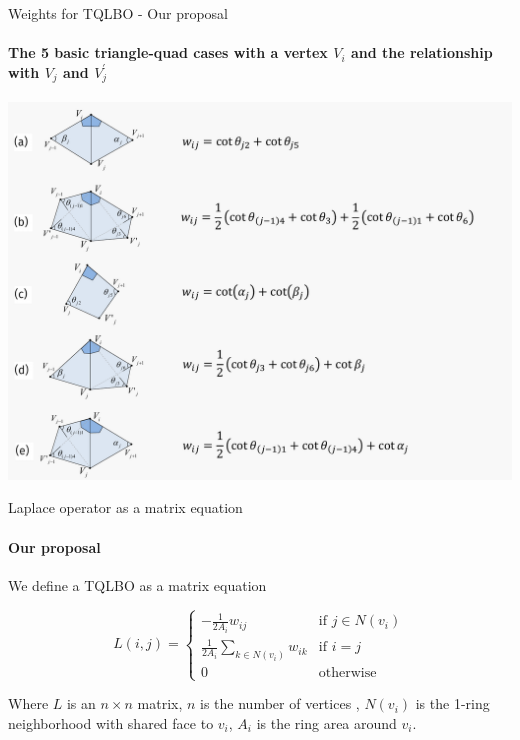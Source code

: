 \documentclass[10pt, compress, english]{beamer}
\begin{document}
\begin{frame}{Weights for TQLBO - Our proposal}


\framesubtitle{{\small{}The 5 basic triangle-quad cases with a vertex $V_{i}$
and the relationship with $V_{j}$ and $V_{j}^{\prime}$}}


\vspace{-10bp}



\hspace{10bp}\includegraphics[width=0.85\paperwidth]{img/proposal_weights}

\end{frame}

\begin{frame}{Laplace operator as a matrix equation}
\framesubtitle{Our proposal}


We define a TQLBO as a matrix equation


\begin{equation}
L\left(i,j\right)=\begin{cases}
-\frac{1}{2A_{i}}w_{ij} & \mbox{if }j\in N\left(v_{i}\right)\\
\frac{1}{2A_{i}}\underset{k\in N\left(v_{i}\right)}{\sum}w_{ik} & \mbox{if }i=j\\
0 & \mbox{otherwise}
\end{cases}\label{eq:TQLBO_Laplacian_Matrix}
\end{equation}



Where $L$ is an $n\times n$ matrix, $n$ is the number of vertices
, $N\left(v_{i}\right)$ is the 1-ring neighborhood with shared face
to $v_{i}$, $A_{i}$ is the ring area around $v_{i}$.

\end{frame}
\end{document}
